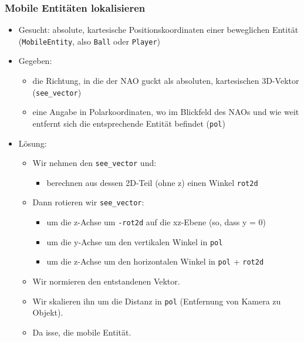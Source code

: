 \subsubsection{Mobile Entitäten lokalisieren}
\begin{itemize}
\item  Gesucht: absolute, kartesische Positionskoordinaten einer beweglichen Entität (\texttt{MobileEntity}, also \texttt{Ball} oder \texttt{Player})
\item  Gegeben:
\begin{itemize}
	\item  die Richtung, in die der NAO guckt als absoluten, kartesischen 3D-Vektor (\texttt{see\_vector})
	\item  eine Angabe in Polarkoordinaten, wo im Blickfeld des NAOs und wie weit entfernt sich die entsprechende Entität befindet (\texttt{pol})
\end{itemize}
\item  Lösung:
\begin{itemize}
	\item  Wir nehmen den \texttt{see\_vector} und:
	\begin{itemize}
		\item  berechnen aus dessen 2D-Teil (ohne z) einen Winkel \texttt{rot2d}
	\end{itemize}
	\item  Dann rotieren wir \texttt{see\_vector}:
	\begin{itemize}
		\item  um die z-Achse um \texttt{-rot2d} auf die xz-Ebene (so, dass y = 0)
		\item  um die y-Achse um den vertikalen Winkel in \texttt{pol}
		\item  um die z-Achse um den horizontalen Winkel in \texttt{pol} + \texttt{rot2d}
	\end{itemize}
	\item  Wir normieren den entstandenen Vektor.
	\item  Wir skalieren ihn um die Distanz in \texttt{pol} (Entfernung von Kamera zu Objekt).
	\item  Da isse, die mobile Entität.
	\end{itemize}
\end{itemize}
